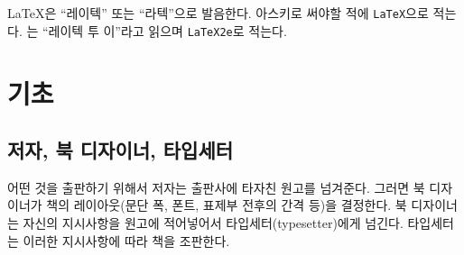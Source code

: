
\LaTeX 은 ``레이텍'' 또는 ``라텍''으로 발음한다. 아스키로 써야할 적에 \texttt{LaTeX}으로 적는다.
\LaTeXe 는 ``레이텍 투 이''라고 읽으며 \texttt{LaTeX2e}로 적는다.



\section{기초}

\subsection{저자, 북 디자이너, 타입세터}

어떤 것을 출판하기 위해서 저자는 출판사에 타자친 원고를 넘겨준다.
그러면 북 디자이너가 책의 레이아웃(문단 폭, 폰트, 표제부 전후의 간격 등)을 결정한다.
북 디자이너는 자신의 지시사항을 원고에 적어넣어서 타입세터(typesetter)에게 넘긴다.
타입세터는 이러한 지시사항에 따라 책을 조판한다.


